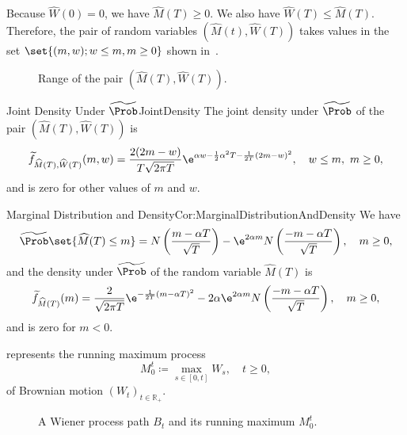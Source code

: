 Because $\widehat{W}(0) = 0$, we have $\widehat{M}(T) \ge 0$. We also have $\widehat{W}(T) \le \widehat{M}(T)$. Therefore, the pair of random variables $(\widehat{M}(t), \widehat{W}(T))$ takes values in the set $\set{(m, w); w \le m, m \ge 0}$ shown in~.

\begin{figure}[H]
	\centering
	
	\caption{Range of the pair $(\widehat{M}(T), \widehat{W}(T))$.}
	\label{fig:RangeOfMW}
\end{figure}

\begin{thm}{Joint Density Under $\widetilde{\Prob}$}{JointDensity}
	The joint density under $\widetilde{\Prob}$ of the pair $(\widehat{M}(T), \widehat{W}(T))$ is
	\begin{equation} \label{eq:JointDensityFormula}
		\widetilde{f}_{\widehat{M}(T),\widehat{W}(T)}(m, w) = \frac{2(2m-w)}{T\sqrt{2\pi T}} \e^{\alpha w - \frac{1}{2}\alpha^2 T - \frac{1}{2T}(2m-w)^2} , \quad w \leq m, \ m \geq 0,
	\end{equation}
	and is zero for other values of $m$ and $w$.
\end{thm}

\begin{cor}{Marginal Distribution and Density}{Cor:MarginalDistributionAndDensity}
	We have
	\begin{equation} \label{eq:MarginalProbability}
		\widetilde{\Prob}\set{\widehat{M}(T) \leq m} = N \left( \frac{m - \alpha T}{\sqrt{T}} \right) - \e^{2\alpha m} N \left( \frac{-m - \alpha T}{\sqrt{T}} \right), \quad m \geq 0,
	\end{equation}
	and the density under $\widetilde{\Prob}$ of the random variable $\widehat{M}(T)$ is
	\begin{equation} \label{eq:MarginalDensity}
		\widetilde{f}_{\widehat{M}(T)}(m) = \frac{2}{\sqrt{2\pi T}} \e^{-\frac{1}{2T}(m-\alpha T)^2} - 2\alpha \e^{2\alpha m} N \left( \frac{-m - \alpha T}{\sqrt{T}} \right), \quad m \geq 0,
	\end{equation}
	and is zero for $m < 0$.
\end{cor}

 represents the running maximum process
\begin{equation}
	M_0^t \coloneqq \max_{s \in [0,t]} W_s, \quad t \geq 0, \nonumber
\end{equation}
of Brownian motion $(W_t)_{t\in\mathbb{R}_{+}}$.
\begin{figure}[H]
	\centering
	
	\caption{A Wiener process path $B_t$ and its running maximum $M_0^t$.}
	\label{fig:runningMax}
\end{figure}


